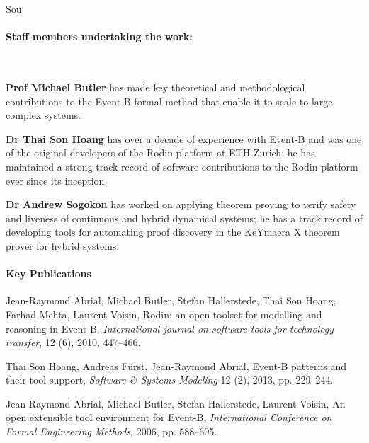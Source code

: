 \begin{sitedescription}{Sou}

\paragraph{Staff members undertaking the work:}~\newline 

\textbf{Prof Michael Butler} has made key theoretical and methodological contributions to the Event-B formal method that enable it to scale to large complex systems.

\textbf{Dr Thai Son Hoang} has over a decade of experience with Event-B and was one of the original developers of the Rodin platform at ETH Zurich; he has maintained a strong track record of software contributions to the Rodin platform ever since its inception.

\textbf{Dr Andrew Sogokon} has worked on applying theorem proving to verify safety and liveness of continuous and hybrid dynamical systems; he has a track record of developing tools for automating proof discovery in the KeYmaera X theorem prover for hybrid systems.

\paragraph{Key Publications} 

\begin{compactitem}
\item Jean-Raymond Abrial, Michael Butler, Stefan Hallerstede, Thai Son Hoang, Farhad Mehta, Laurent Voisin,
	Rodin: an open toolset for modelling and reasoning in Event-B.
{\em International journal on software tools for technology transfer}, 12 (6), 2010, 447--466.
\item 
Thai Son Hoang, Andreas F\"urst, Jean-Raymond Abrial,
Event-B patterns and their tool support,
{\em Software \& Systems Modeling } 12 (2), 2013, pp. 229--244.


\item Jean-Raymond Abrial, Michael Butler, Stefan Hallerstede, Laurent Voisin,
	An open extensible tool environment for Event-B,
	{\em International Conference on Formal Engineering Methods}, 2006, pp. 588--605. 
\end{compactitem}


\end{sitedescription}

